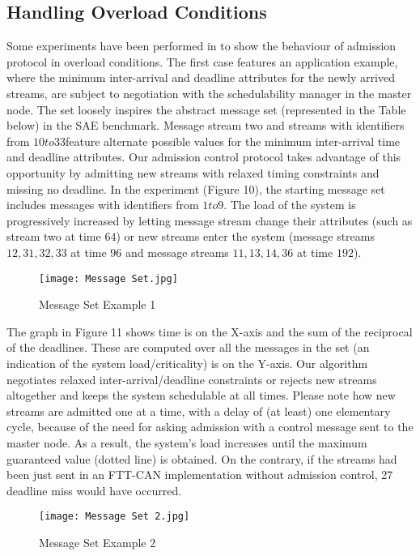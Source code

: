 \documentclass[conference]{IEEEtran}
\begin{document}
\subsection{Handling Overload Conditions}
Some experiments have been performed in\cite{1377703}  to show the behaviour of  admission protocol in overload conditions. The first case features an application example, where the minimum inter-arrival and deadline attributes for the newly arrived streams, are subject to negotiation with the schedulability manager in the master node. The set loosely inspires the abstract message set (represented in the Table below) in the SAE benchmark. Message stream two and streams with identifiers from $10 to 33$feature alternate possible values for the minimum inter-arrival time and deadline attributes. Our admission control protocol takes advantage of this opportunity by admitting new streams with relaxed timing constraints and missing no deadline. In the experiment (Figure 10), the starting message set includes messages with identifiers from $1 to 9$. The load of the system is progressively increased by letting message stream change their attributes (such as stream two at time $64$) or new streams enter the system (message streams $12, 31, 32, 33$ at time $96$ and message streams $11, 13, 14, 36$ at time $192$).

\begin{figure}[htp]
    \centering
    \texttt{[image: Message Set.jpg]}
    \caption{Message Set Example 1{ \cite{1377703}}}
    \label{fig:reg-gen}
\end{figure}

The graph in Figure 11 shows time is on the X-axis and the sum of the reciprocal of the deadlines. These are computed over all the messages in the set (an indication of the system load/criticality) is on the Y-axis. Our algorithm negotiates relaxed inter-arrival/deadline constraints or rejects new streams altogether and keeps the system schedulable at all times. Please note how new streams are admitted one at a time, with a delay of (at least) one elementary cycle, because of the need for asking admission with a control message sent to the master node. As a result, the system's load increases until the maximum guaranteed value (dotted line) is obtained. On the contrary, if the streams had been just sent in an FTT-CAN implementation without admission control, 27 deadline miss would have occurred.
\begin{figure}[htp]
    \centering
    \texttt{[image: Message Set 2.jpg]}
    \caption{Message Set Example 2{ \cite{1377703}}}
    \label{fig:reg-gen}
\end{figure}
\end{document}
